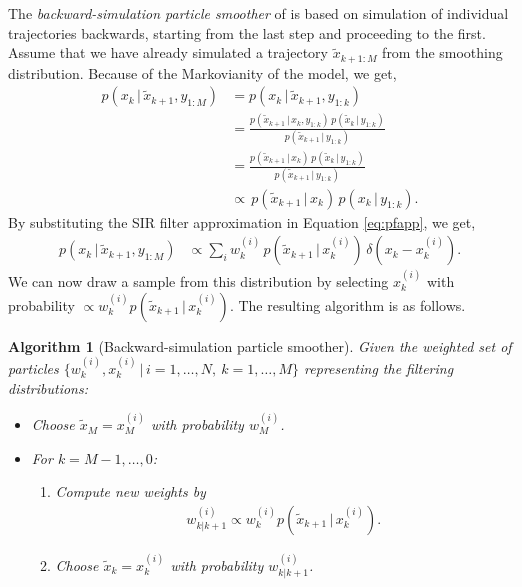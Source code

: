 \documentclass[twocolumn]{autart}    %
\newtheorem{algo}{Algorithm}[section]
\begin{document}
The {\em backward-simulation particle smoother} of \cite{Godsill+Doucet+West:2004} is based on simulation of individual trajectories backwards, starting from the last step and proceeding to the first. Assume that we have already simulated a trajectory $\tilde{x}_{k+1:M}$ from the smoothing distribution. Because of the Markovianity of the model, we get,
%
\begin{equation}
\begin{split}
  p(x_{k}\,|\,\tilde{x}_{k+1},y_{1:M})
  &= p(x_{k}\,|\,\tilde{x}_{k+1},y_{1:k}) \\
  &= \frac{p(\tilde{x}_{k+1}\,|\,x_{k},y_{1:k}) \, p(\tilde{x}_{k}\,|\,y_{1:k})}
          {p(\tilde{x}_{k+1}\,|\,y_{1:k})} \\
  &= \frac{p(\tilde{x}_{k+1}\,|\,x_{k}) \, p(\tilde{x}_{k}\,|\,y_{1:k})}
          {p(\tilde{x}_{k+1}\,|\,y_{1:k})} \\
  &\propto \, p(\tilde{x}_{k+1}\,|\,x_{k}) \, p(x_{k}\,|\,y_{1:k}).
\end{split}
\end{equation}
%
By substituting the SIR filter approximation in Equation \eqref{eq:pfapp}, we get,
%
\begin{equation}
\begin{split}
   p(x_{k}\,|\,\tilde{x}_{k+1},y_{1:M})
   &\propto \sum_i w_k^{(i)} \, p(\tilde{x}_{k+1}\,|\,x_{k}^{(i)}) \,
   \delta(x_k - x_k^{(i)}).
\end{split}
\label{eq:backsimeq}
\end{equation}
%
We can now draw a sample from this distribution by selecting $x_{k}^{(i)}$ with probability $\propto w_k^{(i)} p(\tilde{x}_{k+1}\,|\,x_{k}^{(i)})$. The resulting algorithm is as follows.
%
\begin{algo}[Backward-simulation particle smoother]
  \label{alg:bssmooth} 
  Given the weighted set of particles $\{ w_k^{(i)}, x_k^{(i)} \,|\,
  i=1,\ldots,N,~k=1,\ldots,M \}$ representing the filtering
  distributions:
\begin{itemize}
\item Choose $\tilde{x}_M = x_M^{(i)}$ with probability $w^{(i)}_{M}$.
\item For $k=M-1,\ldots,0$:
\begin{enumerate}
  \item Compute new weights by
    \begin{equation}
      \begin{split}
        w^{(i)}_{k|k+1} \propto
        w_k^{(i)} p(\tilde{x}_{k+1}\,|\,x_{k}^{(i)}).
     \end{split}
    \end{equation}
  \item Choose $\tilde{x}_k = x_k^{(i)}$ with probability
    $w^{(i)}_{k|k+1}$.
  \end{enumerate}
\end{itemize}
\end{algo}
\end{document}
